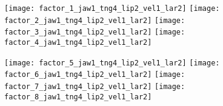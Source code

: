 \documentclass[varwidth=10in]{standalone}
\begin{document}
\raggedright

\texttt{[image: factor\_1\_jaw1\_tng4\_lip2\_vel1\_lar2]}
\texttt{[image: factor\_2\_jaw1\_tng4\_lip2\_vel1\_lar2]}
\texttt{[image: factor\_3\_jaw1\_tng4\_lip2\_vel1\_lar2]}
\texttt{[image: factor\_4\_jaw1\_tng4\_lip2\_vel1\_lar2]}

\texttt{[image: factor\_5\_jaw1\_tng4\_lip2\_vel1\_lar2]}
\texttt{[image: factor\_6\_jaw1\_tng4\_lip2\_vel1\_lar2]}
\texttt{[image: factor\_7\_jaw1\_tng4\_lip2\_vel1\_lar2]}
\texttt{[image: factor\_8\_jaw1\_tng4\_lip2\_vel1\_lar2]}
\end{document}
